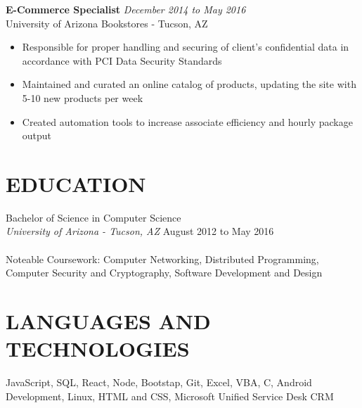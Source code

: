 \documentclass[11pt]{res} %
\begin{document}
\begin{resume}
   
  {\bf E-Commerce Specialist} \hfill  {\sl December 2014 to May 2016}\\
  University of Arizona Bookstores - Tucson, AZ
  
   \begin{itemize} %
   \item Responsible for proper handling and securing of client’s confidential data in accordance with PCI Data Security Standards
   \item Maintained and curated an online catalog of products, updating the site with 5-10 new products per week
   \item Created automation tools to increase associate efficiency and hourly package output
   \end{itemize}
 
\section{EDUCATION}
\vspace{4pt}
    Bachelor of Science in Computer Science \\
    {\sl University of Arizona - Tucson, AZ} \hfill    August 2012 to May 2016\\
    \\
    Noteable Coursework: Computer Networking, Distributed Programming, Computer Security and Cryptography, Software Development and Design
    
\section{LANGUAGES AND TECHNOLOGIES}
\vspace{4pt}
  	JavaScript, SQL, React, Node, Bootstap, Git, Excel, VBA, C, Android Development, Linux, HTML and CSS, Microsoft Unified Service Desk CRM
  	
\end{resume}
\end{document}
